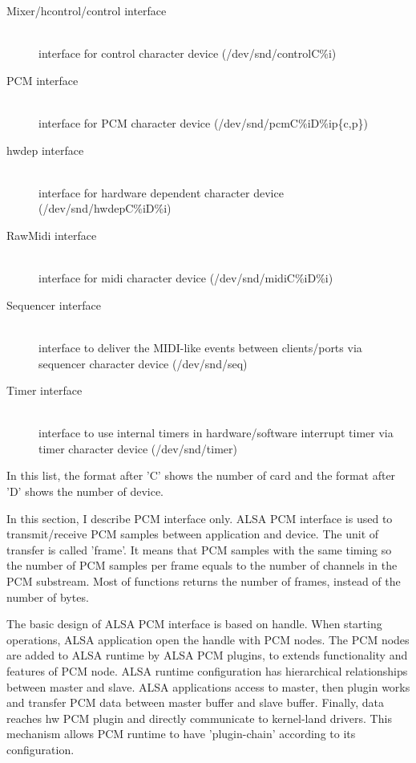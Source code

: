\documentclass[onecolumn]{article}
\begin{document}
\begin{description}
\item[Mixer/hcontrol/control interface] \mbox{} \\
interface for control character device (/dev/snd/controlC\%i)
\item[PCM interface] \mbox{} \\
interface for PCM character device (/dev/snd/pcmC\%iD\%ip\{c,p\})
\item[hwdep interface] \mbox{} \\
interface for hardware dependent character device (/dev/snd/hwdepC\%iD\%i)
\item[RawMidi interface] \mbox{} \\
interface for midi character device (/dev/snd/midiC\%iD\%i)
\item[Sequencer interface] \mbox{} \\
interface to deliver the MIDI-like events between clients/ports via sequencer character device (/dev/snd/seq)
\item[Timer interface] \mbox{} \\
interface to use internal timers in hardware/software interrupt timer via timer character device (/dev/snd/timer)
\end{description}

In this list, the format after 'C' shows the number of card and the format after 'D' shows the number of device.

In this section, I describe PCM interface only. ALSA PCM interface is used to transmit/receive PCM samples between application and device. The unit of transfer is called 'frame'. It means that PCM samples with the same timing so the number of PCM samples per frame equals to the number of channels in the PCM substream. Most of functions returns the number of frames, instead of the number of bytes.

The basic design of ALSA PCM interface is based on handle. When starting operations, ALSA application open the handle with PCM nodes. The PCM nodes are added to ALSA runtime by ALSA PCM plugins, to extends functionality and features of PCM node. ALSA runtime configuration has hierarchical relationships between master and slave. ALSA applications access to master, then plugin works and transfer PCM data between master buffer and slave buffer. Finally, data reaches hw PCM plugin and directly communicate to kernel-land drivers. This mechanism allows PCM runtime to have 'plugin-chain' according to its configuration. 
\end{document}
